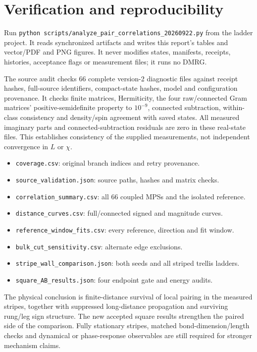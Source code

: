 \documentclass[11pt,letterpaper]{article}
\begin{document}
\section{Verification and reproducibility}
Run \texttt{python scripts/analyze\_pair\_correlations\_20260922.py} from
the ladder project. It reads synchronized artifacts and writes this report's
tables and vector/PDF and PNG figures. It never modifies states, manifests,
receipts, histories, acceptance flags or measurement files; it runs no DMRG.

The source audit checks 66 complete version-2 diagnostic files against
receipt hashes, full-source identifiers, compact-state hashes, model and
configuration provenance. It checks finite matrices, Hermiticity, the four
raw/connected Gram matrices' positive-semidefinite property to $10^{-9}$,
connected subtraction, within-class consistency and density/spin agreement
with saved states. All measured imaginary parts and connected-subtraction
residuals are zero in these real-state files. This establishes consistency
of the supplied measurements, not independent convergence in $L$ or $\chi$.

\begin{itemize}
\item \texttt{coverage.csv}: original branch indices and retry provenance.
\item \texttt{source\_validation.json}: source paths, hashes and matrix checks.
\item \texttt{correlation\_summary.csv}: all 66 coupled MPSs and the isolated reference.
\item \texttt{distance\_curves.csv}: full/connected signed and magnitude curves.
\item \texttt{reference\_window\_fits.csv}: every reference, direction and fit window.
\item \texttt{bulk\_cut\_sensitivity.csv}: alternate edge exclusions.
\item \texttt{stripe\_wall\_comparison.json}: both seeds and all striped trellis ladders.
\item \texttt{square\_AB\_results.json}: four endpoint gate and energy audits.
\end{itemize}

The physical conclusion is finite-distance survival of local pairing in
the measured stripes, together with suppressed long-distance propagation
and surviving rung/leg sign structure. The new accepted square results
strengthen the paired side of the comparison. Fully stationary stripes,
matched bond-dimension/length checks and dynamical or phase-response
observables are still required for stronger mechanism claims.
\end{document}
